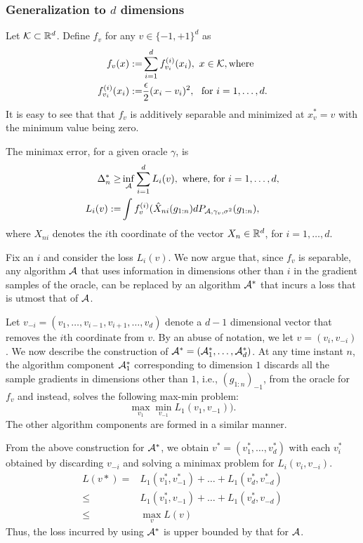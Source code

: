 \subsubsection{Generalization to $d$ dimensions}

Let $\mathcal{K} \subset \mathbb{R}^d$.
Define $f_v$ for any $v\in \{-1,+1\}^d$ as 
\begin{align*}
  f_v(x) :=& \sum_{i=1}^d f^{(i)}_{v_i}(x_i), \,\, x \in \mathcal{K}, \text{where}\\
  f^{(i)}_{v_i}(x_i) :=& \dfrac{\epsilon}{2} (x_i - v_i)^2, \,\, \text{ for } i=1,\ldots,d.
\end{align*}
It is easy to see that that $f_v$ is additively separable and minimized at $x^*_v=v$ with the minimum value being zero.

The minimax error, for a given oracle $\gamma$, is 
\begin{align*}
 \Delta_n^* \ge& \inf_{\mathcal{A}} \sum_{i=1}^d L_i(v), \text{ where, for } i=1,\ldots,d,\\
 L_i(v) := & \int f^{(i)}_v(\hat X_{ni}(g_{1:n}) dP_{\mathcal{A},\gamma_v,\sigma^2}(g_{1:n}),  
\end{align*}
where $X_{ni}$ denotes the $i$th coordinate of the vector $X_n \in \mathbb{R}^d$, for $i=1,\ldots,d$.

Fix an $i$ and consider the loss $L_i(v)$.
We now argue that, since $f_v$ is separable, any algorithm $\mathcal{A}$ that uses information in dimensions other than $i$ in the gradient samples of the oracle, can be replaced by an algorithm $\mathcal{A}^*$ that incurs a loss that is utmost that of $\mathcal{A}$. 

Let $v_{-i}=(v_1,\ldots,v_{i-1},v_{i+1},\ldots,v_d)$ denote a $d-1$ dimensional vector that removes the $i$th coordinate from $v$. By an abuse of notation, we let $v=(v_i, v_{-i})$. 
We now describe the construction of $\mathcal{A}^*=(\mathcal{A}_1^*, \ldots, \mathcal{A}_d^*)$.
At any time instant $n$, the algorithm component $\mathcal{A}_1^*$ corresponding to dimension $1$ discards all the sample gradients in dimensions other than $1$, i.e.,  $(g_{1:n})_{-1}$, from the oracle for $f_v$ and instead, solves the following max-min problem:
$$\max_{v_1} \min_{v_{-1}} L_1(v_1, v_{-1})).$$
The other algorithm components are formed in a similar manner.

From the above construction for $\mathcal{A}^*$, we obtain $v^*=(v_1^*, \ldots, v_d^*)$ with each $v_i^*$ obtained by discarding $v_{-i}$ and solving a minimax problem for $L_i(v_i,v_{-i})$. 
\begin{align*}
 L(v*) = & L_1(v_1^*,v_{-1}^*) + \ldots + L_1(v_d^*,v_{-d}^*) \\
         \le &L_1(v_1^*,v_{-1}) + \ldots + L_1(v_d^*,v_{-d})\\
         \le & \max_v L(v)
\end{align*}
Thus, the loss incurred by using $\mathcal{A}^*$ is upper bounded by that for $\mathcal{A}$. 

